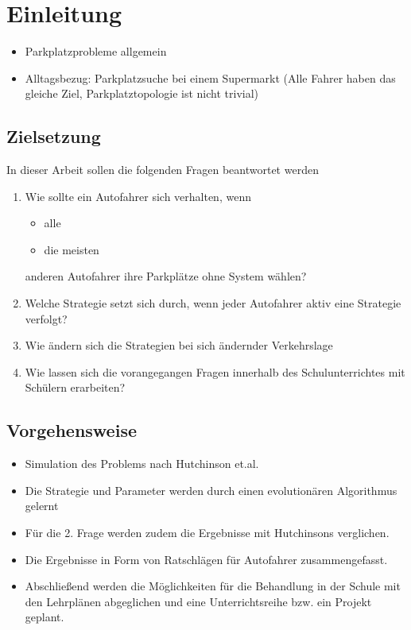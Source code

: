 \section{Einleitung}
\begin{itemize}
	\item Parkplatzprobleme allgemein
	\item Alltagsbezug: Parkplatzsuche bei einem Supermarkt (Alle Fahrer haben das gleiche Ziel, Parkplatztopologie ist nicht trivial)
\end{itemize}

\subsection{Zielsetzung}
In dieser Arbeit sollen die folgenden Fragen beantwortet werden
\begin{enumerate}
	\item Wie sollte ein Autofahrer sich verhalten, wenn
	\begin{itemize}
		\item alle 
		\item die meisten
	\end{itemize}
	anderen Autofahrer ihre Parkplätze ohne System wählen?
	\item Welche Strategie setzt sich durch, wenn jeder Autofahrer aktiv eine Strategie verfolgt?
	\item Wie ändern sich die Strategien bei sich ändernder Verkehrslage
	\item Wie lassen sich die vorangegangen Fragen innerhalb des Schulunterrichtes mit Schülern erarbeiten?
\end{enumerate}

\subsection{Vorgehensweise}
\begin{itemize}
	\item Simulation des Problems nach Hutchinson et.al.
	\item Die Strategie und Parameter werden durch einen evolutionären Algorithmus gelernt
	\item Für die 2. Frage werden zudem die Ergebnisse mit Hutchinsons verglichen.
	\item Die Ergebnisse in Form von Ratschlägen für Autofahrer zusammengefasst. 
	\item Abschließend werden die Möglichkeiten für die Behandlung in der Schule mit den Lehrplänen abgeglichen und eine Unterrichtsreihe bzw. ein Projekt geplant.
\end{itemize}